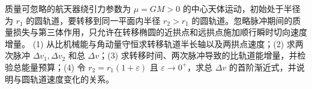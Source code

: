质量可忽略的航天器绕引力参数为 \(\mu=GM>0\) 的中心天体运动，初始处于半径为 \(r_1\) 的圆轨道，要转移到同一平面内半径 \(r_2>r_1\) 的圆轨道。忽略脉冲期间的质量损失与第三体作用，只允许在转移椭圆的近拱点和远拱点施加顺行瞬时切向速度增量。
(1) 从比机械能与角动量守恒求转移轨道半长轴以及两拱点速度；(2) 求两次脉冲 \(\Delta v_1,\Delta v_2\) 和总 \(\Delta v\)；(3) 求转移时间、两次脉冲导致的比轨道能增量，并检验总能量预算；(4) 令 \(r_2=r_1(1+\varepsilon)\) 且 \(\varepsilon\to0^+\)，求总 \(\Delta v\) 的首阶渐近式，并说明与圆轨道速度变化的关系。

